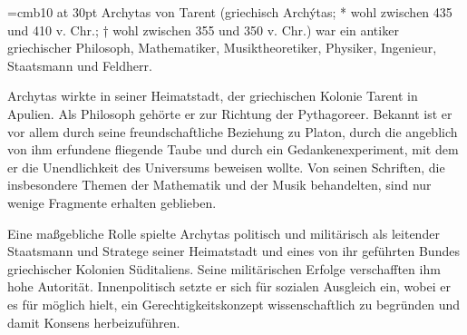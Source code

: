 

\font\Large=cmb10 at 30pt
\Large
Archytas von Tarent (griechisch Archýtas; * wohl zwischen 435
und 410 v. Chr.; † wohl zwischen 355 und 350 v. Chr.) war ein antiker
griechischer Philosoph, Mathematiker, Musiktheoretiker, Physiker,
Ingenieur, Staatsmann und Feldherr.

Archytas wirkte in seiner Heimatstadt, der griechischen Kolonie Tarent
in Apulien. Als Philosoph gehörte er zur Richtung der Pythagoreer.
Bekannt ist er vor allem durch seine freundschaftliche Beziehung zu
Platon, durch die angeblich von ihm erfundene fliegende Taube und durch
ein Gedankenexperiment, mit dem er die Unendlichkeit des Universums
beweisen wollte. Von seinen Schriften, die insbesondere Themen der
Mathematik und der Musik behandelten, sind nur wenige Fragmente erhalten
geblieben.

Eine maßgebliche Rolle spielte Archytas politisch und militärisch als
leitender Staatsmann und Stratege seiner Heimatstadt und eines von ihr
geführten Bundes griechischer Kolonien Süditaliens. Seine militärischen
Erfolge verschafften ihm hohe Autorität. Innenpolitisch setzte er sich
für sozialen Ausgleich ein, wobei er es für möglich hielt, ein
Gerechtigkeitskonzept wissenschaftlich zu begründen und damit Konsens
herbeizuführen.
\bye
